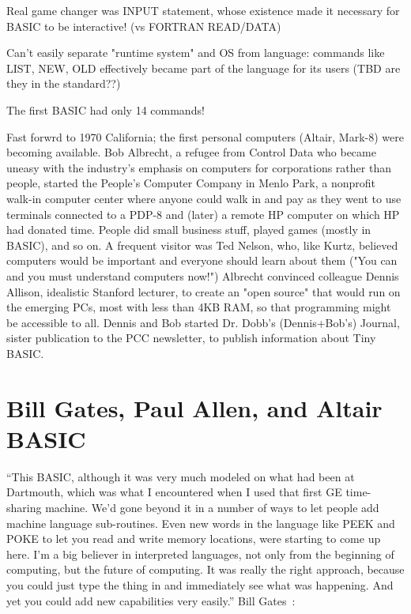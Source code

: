 \documentclass{article}
\begin{document}
Real game changer was INPUT statement, whose existence made it necessary
for BASIC to be interactive!  (vs FORTRAN READ/DATA)

Can't easily separate "runtime system" and OS from language: commands
like LIST, NEW, OLD effectively became part of the language for its
users (TBD are they in the standard??)

The first BASIC had only 14 commands!

Fast forwrd to 1970 California; the first personal computers (Altair,
Mark-8) were becoming available.  Bob Albrecht, a refugee from Control
Data who became uneasy with the industry's emphasis on computers for
corporations rather than people, 
started the People's Computer Company in Menlo Park, a nonprofit walk-in
computer center where anyone could walk in and pay as they went to use
terminals connected to a PDP-8 and (later) a remote HP computer on which
HP had donated time.  People did small business stuff, played games
(mostly in BASIC), and so on.
A frequent visitor was Ted Nelson, who, like Kurtz, believed computers
would be important and everyone should learn about them ("You can and
you must understand computers now!")
Albrecht convinced colleague Dennis Allison,
idealistic Stanford lecturer, to create an "open source"  that
would run on the emerging PCs, most with less than 4KB RAM, so that
programming might be accessible to all.  Dennis and
Bob started Dr. Dobb's (Dennis+Bob's) Journal, sister publication to the
PCC newsletter, to publish information about Tiny BASIC.

\section{Bill Gates, Paul Allen, and Altair BASIC}

``This BASIC, although it was very much modeled on what had been at
Dartmouth, which was what I encountered when I used that first GE
time-sharing machine. We'd gone beyond it in a number of ways to let
people add machine language sub-routines. Even new words in the language
like PEEK and POKE to let you read and write memory locations, were
starting to come up here. I'm a big believer in interpreted languages,
not only from the beginning of computing, but the future of
computing. It was really the right approach, because you could just type
the thing in and immediately see what was happening. And yet you could
add new capabilities very easily.'' Bill Gates~\cite{smithsonian_interview}:
\end{document}
